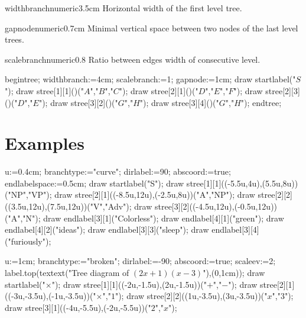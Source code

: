 \documentclass[11pt,a4paper,english]{article}
\begin{document}
\begin{mptparam}{widthbranch}{numeric}{3.5cm}
Horizontal width of the first level tree.
\end{mptparam}

\begin{mptparam}{gapnode}{numeric}{0.7cm}
Minimal vertical space between two nodes of the last level trees.
\end{mptparam}

\begin{mptparam}{scalebranch}{numeric}{0.8}
Ratio between edges width of consecutive level.
\end{mptparam}


\begin{exemple}
begintree;
widthbranch:=4cm;
scalebranch:=1;
gapnode:=1cm;
draw startlabel("$S$");
draw stree[1][1]()("$A$","$B$","$C$");
draw stree[2][1]()("$D$","$E$","$F$");
draw stree[2][3]()("$D$","$E$");
draw stree[3][2]()("$G$","$H$");
draw stree[3][4]()("$G$","$H$");
endtree;
\end{exemple}

\section{Examples}

\begin{exemple}
u:=0.4cm;
branchtype:="curve";
dirlabel:=90;
abscoord:=true;
endlabelspace:=0.5cm;
draw startlabel("S");
draw stree[1][1]((-5.5u,4u),(5.5u,8u))("NP","VP");
draw stree[2][1]((-8.5u,12u),(-2.5u,8u))("A","NP");
draw stree[2][2]((3.5u,12u),(7.5u,12u))("V","Adv");
draw stree[3][2]((-4.5u,12u),(-0.5u,12u))("A","N");
draw endlabel[3][1]("Colorless");
draw endlabel[4][1]("green");
draw endlabel[4][2]("ideas");
draw endlabel[3][3]("sleep");
draw endlabel[3][4]("furiously");
\end{exemple}



\begin{exemple}
u:=1cm;
branchtype:="broken";
dirlabel:=-90;
abscoord:=true;
scaleev:=2;
label.top(textext("\Large Tree diagram of $(2x+1)(x-3)$"),(0,1cm));
draw startlabel("$\times$");
draw stree[1][1]((-2u,-1.5u),(2u,-1.5u))("$+$","$-$");
draw stree[2][1]((-3u,-3.5u),(-1u,-3.5u))("$\times$","$1$");
draw stree[2][2]((1u,-3.5u),(3u,-3.5u))("$x$","$3$");
draw stree[3][1]((-4u,-5.5u),(-2u,-5.5u))("$2$","$x$");
\end{exemple}
\end{document}
